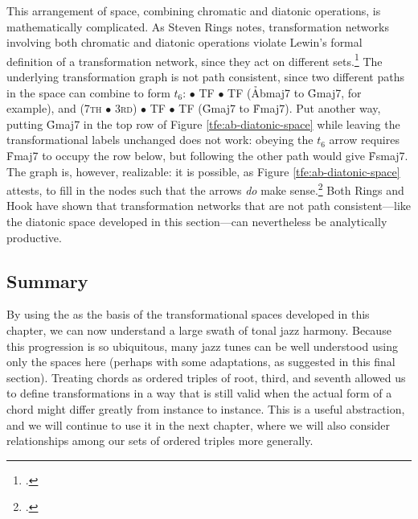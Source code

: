 This arrangement of \tf space, combining chromatic and diatonic operations, is
mathematically complicated. As Steven Rings notes, transformation networks
involving both chromatic and diatonic operations violate Lewin's formal
definition of a transformation network, since they act on different
sets.\footcite[98--99]{rings:2011} The underlying transformation graph is not
path consistent, since two different paths in the space can combine to form
$t_6$: \slideS $\bullet$ TF $\bullet$ TF (\h{Abmaj7} to \h{Gmaj7}, for example), and
(\textsc{7th} $\bullet$ \textsc{3rd}) $\bullet$ TF $\bullet$ TF (\h{Gmaj7} to
\h{Fmaj7}). Put another way, putting \h{Gmaj7} in the top row of Figure
\ref{tfe:ab-diatonic-space} while leaving the transformational labels
unchanged does not work: obeying the $t_6$ arrow requires
\h{Fmaj7} to occupy the row below, but following the other path would give
\h{Fsmaj7}. The graph is, however, realizable: it is possible, as Figure
\ref{tfe:ab-diatonic-space} attests, to fill in the nodes such that the arrows
\emph{do} make sense.\footcite[29]{hook:2007} Both Rings and Hook have shown
that transformation networks that are not path consistent---like the diatonic
\tf space developed in this section---can nevertheless be analytically
productive.

\subsection{Summary}

By using the \tfo as the basis of the transformational spaces developed in
this chapter, we can now understand a large swath of tonal jazz harmony.
Because this progression is so ubiquitous, many jazz tunes can be well
understood using only the spaces here (perhaps with some adaptations, as
suggested in this final section). Treating chords as ordered triples of root,
third, and seventh allowed us to define transformations in a way that is still
valid when the actual form of a chord might differ greatly from instance to
instance. This is a useful abstraction, and we will continue to use it in the
next chapter, where we will also consider relationships among our sets of
ordered triples more generally.


